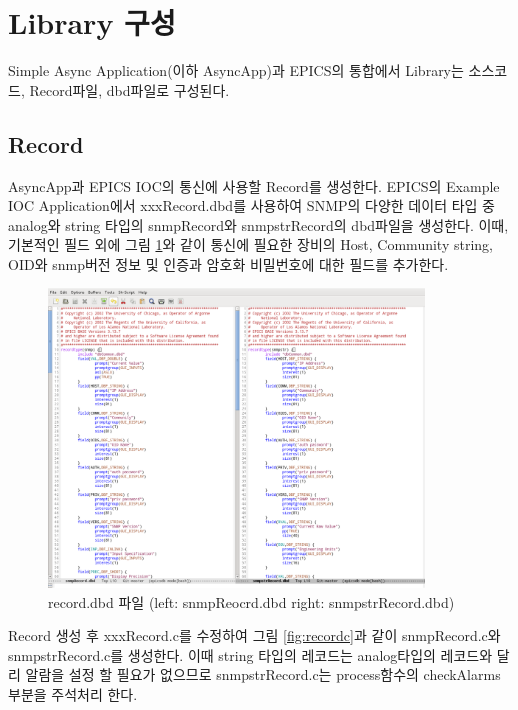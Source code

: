 \documentclass[11pt
  , a4paper
  , article
  , oneside
]{memoir}
\begin{document}
\section{Library 구성}
Simple Async Application(이하 AsyncApp)과 EPICS의 통합에서 Library는 소스코드, Record파일, dbd파일로 구성된다.

\subsection{Record}
AsyncApp과 EPICS IOC의 통신에 사용할 Record를 생성한다. EPICS의 Example IOC Application에서 xxxRecord.dbd를 사용하여 SNMP의 다양한 데이터 타입 중 analog와 string 타입의 snmpRecord와 snmpstrRecord의 dbd파일을 생성한다. 이때, 기본적인 필드 외에 그림 \ref{fig:recorddbd}와 같이 통신에 필요한 장비의 Host, Community string, OID와 snmp버전 정보 및 인증과 암호화 비밀번호에 대한 필드를 추가한다.

\begin{figure}[h!]
  \centering
  \includegraphics[width=0.89\textwidth]{./images/recorddbd.eps}
  \caption{record.dbd 파일 (left: snmpReocrd.dbd right: snmpstrRecord.dbd)}
  \label{fig:recorddbd}   
\end{figure}

Record 생성 후 xxxRecord.c를 수정하여 그림 \ref{fig:recordc}과 같이 snmpRecord.c와 snmpstrRecord.c를 생성한다. 이때 string 타입의 레코드는 analog타입의 레코드와 달리 알람을 설정 할 필요가 없으므로 snmpstrRecord.c는 process함수의 checkAlarms부분을 주석처리 한다. 
\end{document}
